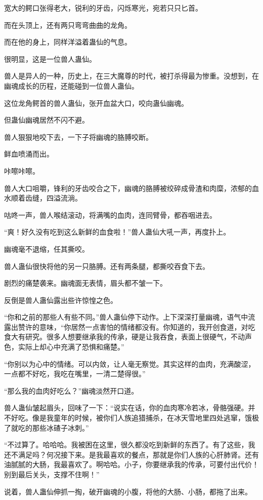 \begin{this_body}
宽大的鳄口张得老大，锐利的牙齿，闪烁寒光，宛若只只匕首。

而在头顶上，还有两只弯弯曲曲的龙角。

而在他的身上，同样洋溢着蛊仙的气息。

很明显，这是一位兽人蛊仙。

兽人是异人的一种，历史上，在三大魔尊的时代，被打杀得最为惨重。没想到，在幽魂成长的历程，还能碰到一位兽人蛊仙。

这位龙角鳄首的兽人蛊仙，张开血盆大口，咬向蛊仙幽魂。

但蛊仙幽魂居然不闪不避。

兽人狠狠地咬下去，一下子将幽魂的胳膊咬断。

鲜血喷涌而出。

咔嚓咔嚓。

兽人大口咀嚼，锋利的牙齿咬合之下，幽魂的胳膊被绞碎成骨渣和肉糜，浓郁的血水顺着齿缝，四溢流淌。

咕咚一声，兽人喉结滚动，将满嘴的血肉，连同臂骨，都吞咽进去。

“爽！好久没有吃到这么新鲜的血食啦！”兽人蛊仙大吼一声，再度扑上。

幽魂毫不退缩，任其撕咬。

兽人蛊仙很快将他的另一只胳膊。还有两条腿，都撕咬吞食下去。

剧烈的痛楚袭来。幽魂面无表情，眉头都不皱一下。

反倒是兽人蛊仙露出些许惊惶之色。

“你和之前的那些人有些不同。”兽人蛊仙停下动作。上下深深打量幽魂，语气中流露出赞许的意味，“你居然一点害怕的情绪都没有。你知道的，我开创食道，对吃食大有研究。很多人想要继承我的传承，硬是让我吞食，表面上很硬气，不动声色，实际上却心中充满了恐惧和痛楚。”

“你别以为心中的情绪。可以内敛，让人毫无察觉。其实这样的血肉，充满酸涩，一点都不好吃，我吃在嘴里，一清二楚得很。”

“那么我的血肉好吃么？”幽魂淡然开口道。

兽人蛊仙皱起眉头，回味了一下：“说实在话，你的血肉寒冷若冰，骨骼强硬。并不好吃。像是我童年的时候，被你们人族追猎捕杀，在冰天雪地里四处逃窜，饿极了就吃的那些冰碴子冰刺。”

“不过算了。哈哈哈。我被困在这里，很久都没吃到新鲜的东西了。有了这些，我还不满足吗？何况接下来。是我最喜欢的餐点，那就是你们人族的心肝肺肾。还有油腻腻的大肠，我最喜欢了。啊哈哈。小子，你要继承我的传承，可要付出代价！别到最后关头，支撑不住啊！”

说着，兽人蛊仙伸抓一掏，破开幽魂的小腹，将他的大肠、小肠，都拖了出来。


\end{this_body}
